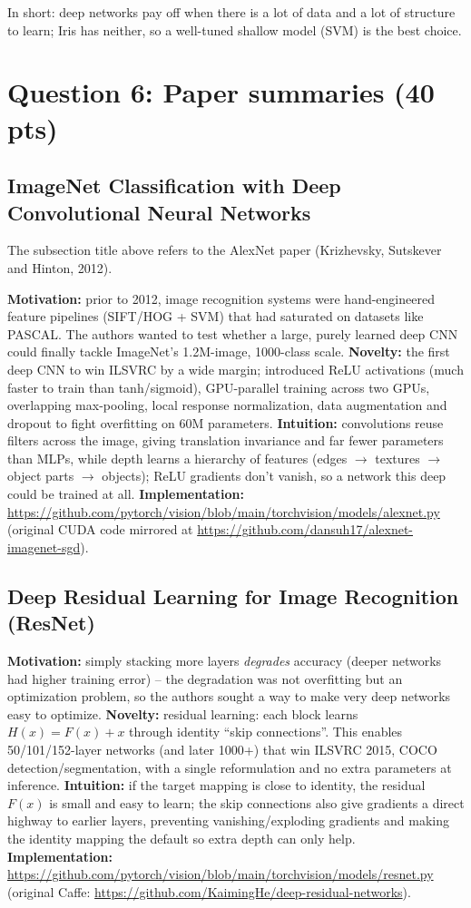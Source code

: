 \documentclass[11pt,a4paper]{article}
\begin{document}
In short: deep networks pay off when there is a lot of data and a lot of structure to
learn; Iris has neither, so a well-tuned shallow model (SVM) is the best choice.

\section{Question 6: Paper summaries (40 pts)}

\subsection{ImageNet Classification with Deep Convolutional Neural Networks}

The subsection title above refers to the AlexNet paper (Krizhevsky, Sutskever and
Hinton, 2012).

\textbf{Motivation:} prior to 2012, image recognition systems were hand-engineered
feature pipelines (SIFT/HOG + SVM) that had saturated on datasets like PASCAL. The
authors wanted to test whether a large, purely learned deep CNN could finally tackle
ImageNet's 1.2M-image, 1000-class scale.
\textbf{Novelty:} the first deep CNN to win ILSVRC by a wide margin; introduced ReLU
activations (much faster to train than tanh/sigmoid), GPU-parallel training across two
GPUs, overlapping max-pooling, local response normalization, data augmentation and
dropout to fight overfitting on 60M parameters.
\textbf{Intuition:} convolutions reuse filters across the image, giving translation
invariance and far fewer parameters than MLPs, while depth learns a hierarchy of
features (edges $\to$ textures $\to$ object parts $\to$ objects); ReLU gradients don't
vanish, so a network this deep could be trained at all.
\textbf{Implementation:}
\url{https://github.com/pytorch/vision/blob/main/torchvision/models/alexnet.py}
(original CUDA code mirrored at
\url{https://github.com/dansuh17/alexnet-imagenet-sgd}).

\subsection{Deep Residual Learning for Image Recognition (ResNet)}
\textbf{Motivation:} simply stacking more layers \emph{degrades} accuracy (deeper
networks had higher training error) -- the degradation was not overfitting but an
optimization problem, so the authors sought a way to make very deep networks easy to
optimize.
\textbf{Novelty:} residual learning: each block learns $H(x)=F(x)+x$ through
identity ``skip connections''. This enables 50/101/152-layer networks (and later
1000+) that win ILSVRC 2015, COCO detection/segmentation, with a single
reformulation and no extra parameters at inference.
\textbf{Intuition:} if the target mapping is close to identity, the residual $F(x)$
is small and easy to learn; the skip connections also give gradients a direct highway
to earlier layers, preventing vanishing/exploding gradients and making the identity
mapping the default so extra depth can only help.
\textbf{Implementation:}
\url{https://github.com/pytorch/vision/blob/main/torchvision/models/resnet.py}
(original Caffe: \url{https://github.com/KaimingHe/deep-residual-networks}).
\end{document}
